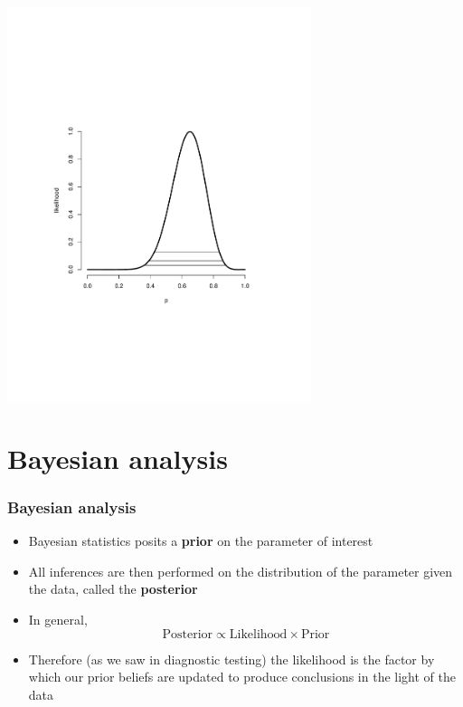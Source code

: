 \documentclass[aspectratio=169]{beamer}
\begin{document}
\begin{frame}
\includegraphics[width=3.5in]{binomialLikelihoodExample.pdf}
\end{frame}

\section{Bayesian analysis}
\begin{frame}\frametitle{Bayesian analysis}
\begin{itemize}
\item Bayesian statistics posits a {\bf prior} on the parameter
  of interest
\item All inferences are then performed on the distribution of 
  the parameter given the data, called the {\bf posterior}
\item In general,
  $$
  \mbox{Posterior} \propto \mbox{Likelihood} \times \mbox{Prior}
  $$
\item Therefore (as we saw in diagnostic testing) the likelihood is
  the factor by which our prior beliefs are updated to produce
  conclusions in the light of the data
\end{itemize}
\end{frame}
\end{document}
